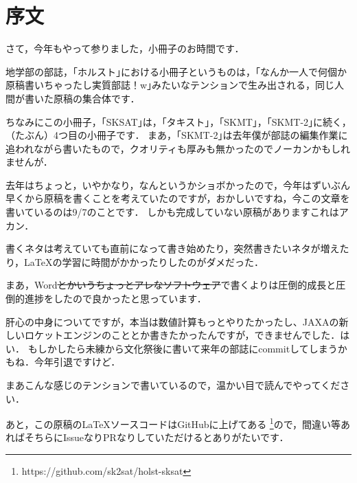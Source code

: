 \chapter*{序文}
さて，今年もやって参りました，小冊子のお時間です．

地学部の部誌，｢ホルスト｣における小冊子というものは，｢なんか一人で何個か原稿書いちゃったし実質部誌！w｣みたいなテンションで生み出される，同じ人間が書いた原稿の集合体です．


ちなみにこの小冊子，｢SKSAT｣は，｢タキスト｣，｢SKMT｣，｢SKMT-2｣に続く，（たぶん）4つ目の小冊子です．
まあ，｢SKMT-2｣は去年僕が部誌の編集作業に追われながら書いたもので，クオリティも厚みも無かったのでノーカンかもしれませんが．


去年はちょっと，いやかなり，なんというかショボかったので，今年はずいぶん早くから原稿を書くことを考えていたのですが，おかしいですね，今この文章を書いているのは9/7のことです．
しかも完成していない原稿がありますこれはアカン．

書くネタは考えていても直前になって書き始めたり，突然書きたいネタが増えたり，\LaTeX の学習に時間がかかったりしたのがダメだった．

まあ，Word\sout{とかいうちょっとアレなソフトウェア}で書くよりは圧倒的成長と圧倒的進捗をしたので良かったと思っています．


肝心の中身についてですが，本当は数値計算もっとやりたかったし、JAXAの新しいロケットエンジンのこととか書きたかったんですが，できませんでした．はい．
もしかしたら未練から文化祭後に書いて来年の部誌にcommitしてしまうかもね．今年引退ですけど．


まあこんな感じのテンションで書いているので，温かい目で読んでやってください．


あと，この原稿の\LaTeX ソースコードはGitHubに上げてある
\footnote{https://github.com/sk2sat/holst-sksat}ので，間違い等あればそちらにIssueなりPRなりしていただけるとありがたいです．
